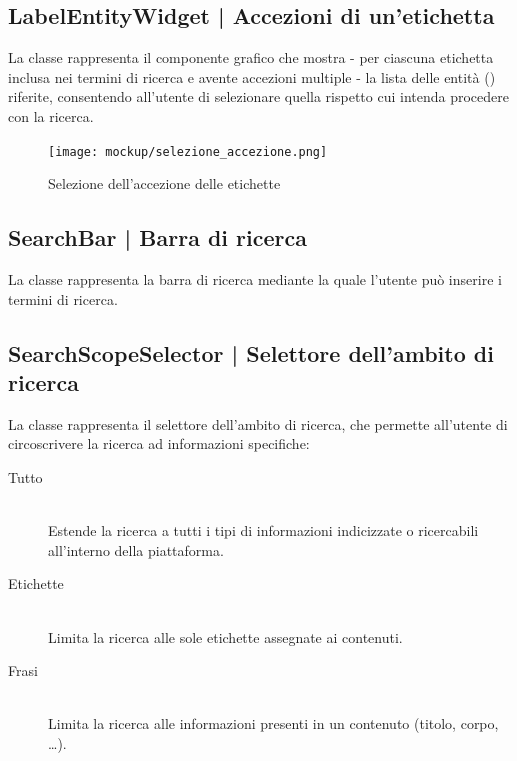 \documentclass[10pt,a4paper,headinclude,footinclude,hidelinks]{scrreprt} %
\begin{document}
	\subsection[LabelEntityWidget]{LabelEntityWidget | Accezioni di un'etichetta}
	\label{sec:stage:design:view.search:label-entity-list}
	La classe \textit{} rappresenta il componente grafico che mostra - per ciascuna etichetta inclusa nei termini di ricerca e avente accezioni multiple - la lista delle entità (\textit{}) riferite, consentendo all'utente di selezionare quella rispetto cui intenda procedere con la ricerca.

	\begin{figure}[ht]
		\begin{center}
	    	\texttt{[image: mockup/selezione\_accezione.png]}
			\label{gfx:mockup:label-entity}
			\caption{Selezione dell'accezione delle etichette}
		\end{center}
	\end{figure}

	\subsection[SearchBar]{SearchBar | Barra di ricerca}
	\label{sec:stage:design:view.search:search-bar}
	La classe \textit{} rappresenta la barra di ricerca mediante la quale l'utente può inserire i termini di ricerca.

	\subsection[SearchScopeSelector]{SearchScopeSelector | Selettore dell'ambito di ricerca}
	\label{sec:stage:design:view.search:search-scope-selector}
	La classe \textit{} rappresenta il selettore dell'ambito di ricerca, che permette all'utente di circoscrivere la ricerca ad informazioni specifiche:
	\begin{description}
	\item[Tutto] \hfill \\
	Estende la ricerca a tutti i tipi di informazioni indicizzate o ricercabili all'interno della piattaforma.
 	\item[Etichette] \hfill \\
	Limita la ricerca alle sole etichette assegnate ai contenuti.
	\item[Frasi] \hfill \\
	Limita la ricerca alle informazioni presenti in un contenuto (titolo, corpo, \ldots).
	\end{description}
\end{document}
